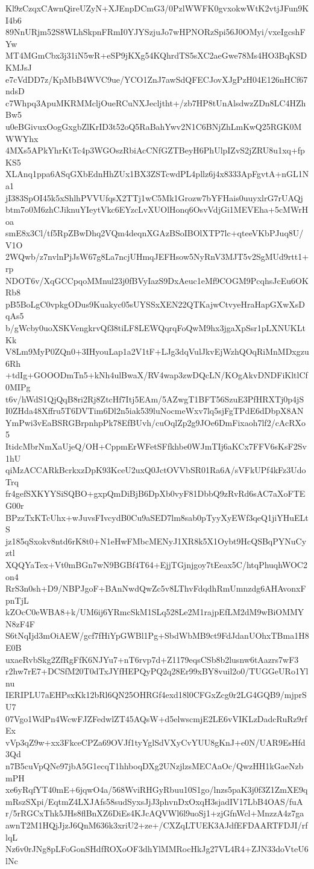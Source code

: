 Kl9zCzqxCAwnQireUZyN+XJEnpDCmG3/0PzlWWFK0gvxokwWtK2vtjJFun9KI4b6
89NnURjm52S8WLhSkpnFRmI0YJYSzjuJo7wHPNORzSpi56J0OMyi/vxeIgcshFYw
MT4MGmCbx3j31iN5wR+eSP9jKXg54KQhrdTS5sXC2aeGwe78Ms4HO3BqKSDKMJsJ
e7cVdDD7z/KpMbB4WVC9ue/YCO1ZnJ7awSdQFECJovXJgPzH04E126nHCf67ndsD
c7Whpq3ApuMKRMMcljOueRCuNXJecljtht+/zb7HP8tUnAlsdwzZDn8LC4HZhBw5
u0eBGivuxOogGxgbZlKrID3t52oQ5RaBahYwv2N1C6BNjZhLmKwQ25RGK0MWWYhx
4MXs5APkYhrKtTc4p3WGOszRbiAcCNfGZTBeyH6PhUlpIZvS2jZRU8u1xq+fpKS5
XLAnq1ppa6ASqGXbEdnHhZUx1BX3ZSTcwdPL4pllz6j4x8333ApFgvtA+nGL1Na1
jI383SpOI45k5xShlhPVVUfqsX2TTj1wC5Mk1Grozw7bYFHais0uuyxlrG7rUAQj
btm7o0M6zhCJiknuYIeytVkc6EYzcLvXUOlHonq6OsvVdjGi1MEVEha+5cMWrHoa
smE8x3Cl/tf5RpZBwDhq2VQm4deqnXGAzBSoIBOlXTP7lc+qteeVKbPJuq8U/V1O
2WQwb/z7nvlnPjJsW67g8La7ncjUHmqJEFHsow5NyRnV3MJT5v2SgMUd9rtt1+rp
NDOT6v/XqGCCpqoMMnul23j0fBVyIazS9DxAeuc1eMf9COGM9PcqhsJcEu6OKRb8
pB5BoLgC0vpkgODus9Kuakyc05sUYSSxXEN22QTKajwCtvyeHraHapGXwXsDqAs5
b/gWcby0uoXSKVengkrvQf38tiLF8LEWQqrqFoQwM9hx3jgaXpSsr1pLXNUKLtKk
V8Lm9MyP0ZQn0+3IHyouLap1a2V1tF+LJg3dqVulJkvEjWzhQOqRiMnMDxgzu6Rh
+tdIg+GOOODmTn5+kNh4ulBwaX/RV4wap3zwDQcLN/KOgAkvDNDFiKltlCf0MIPg
t6v/hWdS1QjQqB8ri2Rj8ZtcHf7Itj5EAm/5AZwgT1BFT56SzuE3PfHRXTj0p4jS
I0ZHda48Xffru5T6DVTim6Dl2n5iak539luNocmeWxv7lq5sjFgTPdE6dDbpX8AN
YmPwi3vEaBSRGBrpnhpPk78EfBUvh/cuOqlZp2g9JOe6DmFixaoh7lf2/cAcRXo5
ItidcMbrNmXaUjeQ/OH+CppmErWFetSFfkhbe0WJmTIj6aKCx7FFV6sKsF2Sv1hU
qiMzACCARkBcrkxzDpK93KceU2uxQ0JctOVVbSR01Ra6A/sVFkUPf4kFz3UdoTrq
fr4gefSXKYYSiSQBO+gxpQmDiBjB6DpXb0vyF81DbbQ9zRvRd6sAC7aXoFTEG00r
BPzzTxKTcUhx+wJuvsFIvcydB0Cu9aSED7lm8sab0pTyyXyEWf3qeQ1jiYHuELtS
jz185qSxokv8ntd6rK8t0+N1eHwFMbcMENyJ1XR8k5X1Oybt9HcQSBqPYNuCyztl
XQQYaTex+Vt0mBGn7wN9BGBf4T64+EjjTGjnjgoy7tEeax5C/htqPhuqhWOC2on4
RrS3n0sh+D9/NBPJgoF+BAnNwdQwZc5v8LThvFdqdhRmUmnzdg6AHAvonxFpnTjL
kZOcC0eWBA8+k/UM6ij6YRmcSkM1SLq528Le2M1rajpEfLM2dM9wBiOMMYN8zF4F
S6tNqIjd3mOiAEW/gcf7fHiYpGWBl1Pg+SbdWbMB9ct9FdJdanUOhxTBma1H8E0B
uxaeRvbSkg2ZfRgFfK6NJYu7+nT6rvp7d+Z1179eqsCSb8b2lusnw6tAazrs7wF3
r2hw7rE7+DCSfM20T0dTxJYfHEPQyPQ2q28Er99xBY8vuil2o0/TUGGeURo1Ylnu
IERIPLU7aEHPsxKk12bRl6QN25OHRGf4exd18l0CFGxZcg0r2LG4GQB9/mjprSU7
07Vgo1WdPn4WcwFJZFedwlZT45AQsW+d5elwscmjE2LE6vVIKLzDadcRuRz9rfEx
vVp3qZ9w+xx3FkceCPZa69OVJf1tyYglSdVXyCvYUU8gKnJ+e0N/UAR9EsHfd3Qd
n7B5cuVpQNe97jbA5G1ecqT1hhboqDXg2UNzjlzsMECAaOc/QwzHH1kGaeNzbmPH
xe6yRqfYT40mE+6jqwO4a/568WviRHGyRbuu10S1go/lnzs5paK3j0f3Z1ZmXE9q
mRszSXpi/EqtmZ4LXJAfs58sudSyxsJjJ3phvnDxOxqH3sjadIV17LbB4OAS/fuA
r/5rRGCxThk5JHs8flBnXZ6DiEs4KJcAQVWl6l9uoSj1+zjGfnWcl+MnzzA4z7ga
awnT2M1HQjJjzJ6QnM636k3xriU2+ze+/CXZqLTUEK3AJdfEFDAARTFDJI/rflqL
Nz6v0rJNg8pLFoGonSHdfROXoOF3dhYlMMRocHkJg27VL4R4+ZJN33doVteU6lNc
